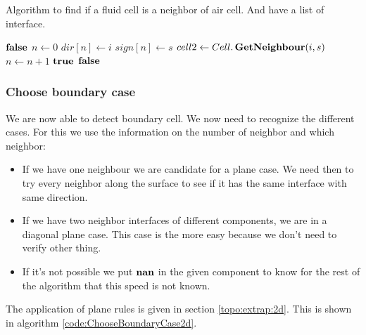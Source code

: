 \begin{algorithm}
\caption{Algorithm to find if a fluid cell is a neighbor of air cell. And have a list of interface.}\label{code:IsBoundary}
\begin{algorithmic}[1]
\State   \Return $\mathop{\textbf{false}}$ 
\EndIf
\State $n\gets 0$
 
 
\State $dir[n]\gets i$ 
\State $sign[n]\gets s$ 
		\State $cell2 \gets Cell.\mathop{\textbf{GetNeighbour}}(i,s)$
			\State $n\gets n+1$ 
		\EndIf
		\EndIf
\EndFor
\EndFor
{}
\State \Return $\mathop{\textbf{true}}$ 
\EndIf
\State \Return $\mathop{\textbf{false}}$ 
\EndFunction
\end{algorithmic}
\end{algorithm}


\subsubsection{Choose boundary case}
We are now able to detect boundary cell. We now need to recognize the different cases.
For this we use the information on the number of neighbor and which neighbor:
\begin{itemize}
\item If we have one neighbour we are candidate for a plane case. We need then to try every neighbor along the surface to
see if it has the same interface with same direction.
\item  If we have two neighbor interfaces of different components, we are in a diagonal plane case.
This case is the more easy because we don't need to verify other thing.
\item If it's not possible we put $\mathop{\textbf{nan}}$ in the given component to know for the rest of the algorithm that this speed is not known.
\end{itemize}
The application of plane rules is given in section \ref{topo:extrap:2d}.
This is shown in algorithm \ref{code:ChooseBoundaryCase2d}.

